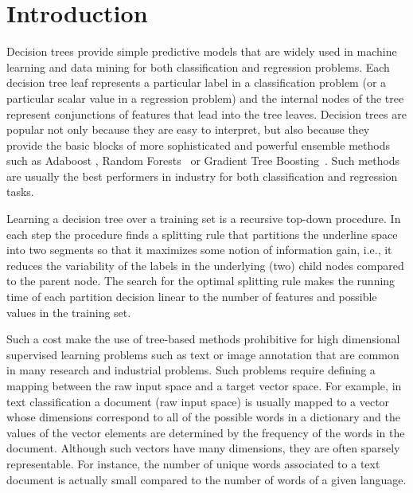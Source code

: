 \section{Introduction}


Decision trees provide simple predictive models that are widely used
in machine learning and data mining for both classification and
regression problems. Each decision tree leaf represents a particular
label in a classification problem (or a particular scalar value in a
regression problem) and the internal nodes of the tree represent
conjunctions of features that lead into the tree leaves. Decision
trees are popular not only because they are easy to interpret, but
also because they provide the basic blocks of more sophisticated and
powerful ensemble methods such as Adaboost \cite{freund1995desicion},
Random Forests~\cite{breiman2001random} or Gradient Tree
Boosting~\cite{friedman2001greedy}. Such methods are usually the best
performers in industry for both classification and regression tasks.

Learning a decision tree over a training set is a recursive top-down
procedure. In each step the procedure finds a splitting rule that
partitions the underline space into two segments so that it maximizes
some notion of information gain, i.e., it reduces the variability of
the labels in the underlying (two) child nodes compared to the parent
node. The search for the optimal splitting rule makes the running time
of each partition decision linear to the number of features and
possible values in the training set.

Such a cost make the use of tree-based methods prohibitive for high
dimensional supervised learning problems such as text or image
annotation that are common in many research and industrial
problems. Such problems require defining a mapping between the raw
input space and a target vector space. For example, in text
classification a document (raw input space) is usually mapped to a
vector whose dimensions correspond to all of the possible words in a
dictionary and the values of the vector elements are determined by
the frequency of the words in the document.  Although such vectors
have many dimensions, they are often sparsely representable. For
instance, the number of unique words associated to a text document is
actually small compared to the number of words of a given language.

